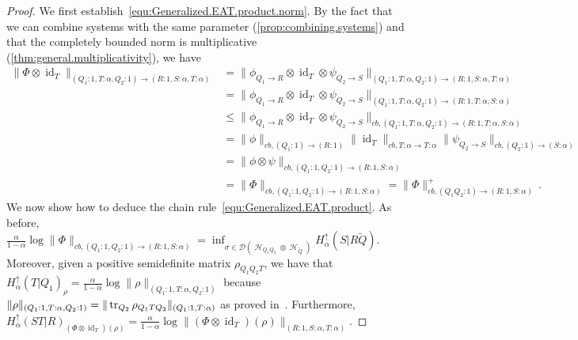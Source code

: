 \documentclass[11pt]{article}
\DeclareMathOperator{\id}{id}
\newcommand{\1}{\ensuremath{\mathbbm{1}}}
\theoremstyle{newdefinition}
\theoremstyle{newplain}
\theoremstyle{myplain}
\DeclareMathOperator{\cH}{\mathcal{H}}
\begin{document}
\begin{proof}
We first establish~\eqref{equ:Generalized.EAT.product.norm}. By the fact that we can combine systems with the same parameter (\cref{prop:combining.systems}) and that the completely bounded norm is multiplicative (\cref{thm:general.multiplicativity}), we have
\begin{align}
\| \Phi \otimes \id_{T} \|_{(Q_1:1,T:\alpha,Q_2:1)\to(R:1,S:\alpha,T:\alpha)} 
&= \|\phi_{Q_1\to R}\otimes\id_T\otimes\psi_{Q_2\to S}\|_{(Q_1:1,T:\alpha,Q_2:1)\to(R:1,S:\alpha,T:\alpha)} \\
&= \|\phi_{Q_1\to R}\otimes\id_T\otimes\psi_{Q_2\to S}\|_{(Q_1:1,T:\alpha,Q_2:1)\to(R:1,T:\alpha,S:\alpha)} \\
&\leq \|\phi_{Q_1\to R}\otimes\id_T\otimes\psi_{Q_2\to S}\|_{cb,(Q_1:1,T:\alpha,Q_2:1)\to(R:1,T:\alpha,S:\alpha)} \\
&= \|\phi\|_{cb,(Q_1:1) \to (R:1)} \|\id_T\|_{cb,T:\alpha \to T:\alpha} \|\psi_{Q_2\to S}\|_{cb,(Q_2:1) \to (S:\alpha)} \\
&= \|\phi \otimes \psi\|_{cb,(Q_1:1,Q_2:1) \to (R:1,S:\alpha)} \\
&= \| \Phi \|_{cb,(Q_1:1,Q_2:1) \to (R:1,S:\alpha)}
= \| \Phi \|_{cb,(Q_1Q_2:1) \to (R:1,S:\alpha)}^+\,.
\end{align}
We now show how to deduce the chain rule~\eqref{equ:Generalized.EAT.product}. As before, $\frac{\alpha}{1-\alpha} \log \| \Phi \|_{cb,(Q_1:1,Q_2:1) \to (R:1,S:\alpha)} = \inf_{\sigma \in \mathcal{D}(\cH_{Q_1Q_2} \otimes \cH_{\tilde{Q}})} H_{\alpha}^{\uparrow}(S|R\tilde{Q})$. Moreover, given a positive semidefinite matrix $\rho_{Q_1Q_2T}$, we have that $H_{\alpha}^{\uparrow}(T|Q_1)_{\rho} = \frac{\alpha}{1-\alpha} \log \| \rho \|_{(Q_1:1,T:\alpha, Q_2:1)}$ because $\| \rho \|_{(Q_1:1,T:\alpha, Q_2:1)} = \|\tr_{Q_2} \rho_{Q_1TQ_2} \|_{(Q_1:1,T:\alpha)}$ as proved in~\cite[Section 3.5]{Devetak.2006}. Furthermore, $H_{\alpha}^{\uparrow}(ST|R)_{(\Phi \otimes \id_T)(\rho)} = \frac{\alpha}{1-\alpha} \log \|(\Phi \otimes \id_T)(\rho)\|_{(R:1,S:\alpha,T:\alpha)}$.
\end{proof}
\end{document}
